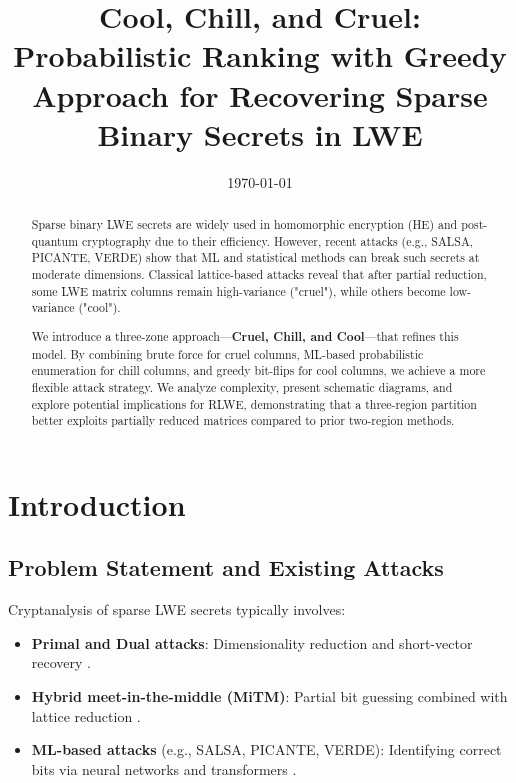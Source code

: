 \documentclass[conference]{IEEEtran}
\title{\fontsize{18}{22}\selectfont Cool, Chill, and Cruel: Probabilistic Ranking with Greedy \\ Approach for Recovering Sparse Binary Secrets in LWE}
\author{\IEEEauthorblockN{MAMANCHUK Mykola, SID.202420671 \\ Supervising Professor: KUNIHIRO Noboru }
\IEEEauthorblockA{University of Tsukuba / CRISEC}
}
\date{\today}
\begin{document}
\maketitle

\begin{abstract}
    Sparse binary LWE secrets are widely used in homomorphic encryption (HE) and post-quantum cryptography due to their efficiency. However, recent attacks (e.g., SALSA, PICANTE, VERDE) show that ML and statistical methods can break such secrets at moderate dimensions. Classical lattice-based attacks reveal that after partial reduction, some LWE matrix columns remain high-variance ("cruel"), while others become low-variance ("cool").
    
    We introduce a three-zone approach—\textbf{Cruel, Chill, and Cool}—that refines this model. By combining brute force for cruel columns, ML-based probabilistic enumeration for chill columns, and greedy bit-flips for cool columns, we achieve a more flexible attack strategy. We analyze complexity, present schematic diagrams, and explore potential implications for RLWE, demonstrating that a three-region partition better exploits partially reduced matrices compared to prior two-region methods.
    \end{abstract}

    \section{Introduction}
    
    \subsection{Problem Statement and Existing Attacks}
    
    Cryptanalysis of sparse LWE secrets typically involves:
    \begin{itemize}
        \item \textbf{Primal and Dual attacks}: Dimensionality reduction and short-vector recovery \cite{primal-dual}.
        \item \textbf{Hybrid meet-in-the-middle (MiTM)}: Partial bit guessing combined with lattice reduction \cite{hybrid-mitm}.
        \item \textbf{ML-based attacks} (e.g., SALSA, PICANTE, VERDE): Identifying correct bits via neural networks and transformers \cite{salsa, picante, salsa-verde}.
    \end{itemize}
    
\end{document}
